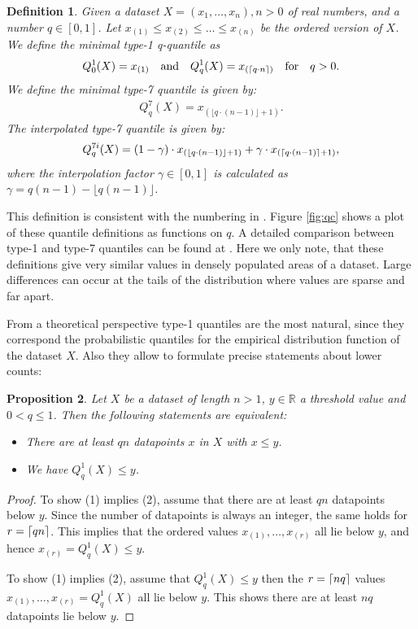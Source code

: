 \documentclass{article}
\DeclarePairedDelimiter{\ceil}{\lceil}{\rceil}
\theoremstyle{plain}
\newtheorem{definition}{Definition}[section]
\newtheorem{proposition}[definition]{Proposition}
\theoremstyle{remark}
\newcommand{\IR}{\mathbb{R}}
\newcommand{\qtext}[1]{\quad\text{#1}\quad} %
\newcommand{\floor}[1]{\lfloor#1\rfloor}
\begin{document}
\begin{definition}
  Given a dataset $X=(x_1,\dots,x_n), n>0$ of real numbers, and a number $q \in [0,1]$.
  Let $x_{(1)} \leq x_{(2)} \leq \dots \leq x_{(n)}$ be the ordered version of $X$.
  We define the minimal type-1 q-quantile as
  \begin{align*}
    Q^1_0(X) = x_{(1)} \qtext{and}  Q^1_q(X) = x_{(\ceil{q \cdot n})} \qtext{for} q > 0.
  \end{align*}
  We define the minimal type-7 quantile is given by:
  \begin{align*}
    Q^{7}_q(X) = x_{(\floor{q \cdot (n - 1)} + 1)}.
  \end{align*}
  The interpolated type-7 quantile is given by:
  \begin{align*}
    Q^{7i}_q(X) = (1 - \gamma) \cdot x_{(\floor{q \cdot (n - 1)} + 1)} + \gamma \cdot x_{(\ceil{q \cdot (n - 1)} + 1)},
  \end{align*}
  where the interpolation factor $\gamma \in [0,1]$ is calculated as $\gamma = q(n-1) - \floor{q(n-1)}$.
\end{definition}

This definition is consistent with the numbering in \cite{HF1996}.
Figure \ref{fig:qc} shows a plot of these quantile definitions as functions on $q$.
A detailed comparison between type-1 and type-7 quantiles can be found at \cite{HH19}.
Here we only note, that these definitions give very similar values in densely populated areas of a dataset.
Large differences can occur at the tails of the distribution where values are sparse and far apart.

From a theoretical perspective type-1 quantiles are the most natural, since they correspond the
probabilistic quantiles for the empirical distribution function of the dataset $X$.
Also they allow to formulate precise statements about lower counts:

\begin{proposition}
  Let $X$ be a dataset of length $n > 1$, $y \in \IR$ a threshold value and $0 < q \leq 1$.
  Then the following statements are equivalent:
  \begin{itemize}
  \item[(1)] There are at least $q n$ datapoints $x$ in $X$ with $x \leq y$.
  \item[(2)] We have $Q^1_q(X) \leq y$.
  \end{itemize}
\end{proposition}

\begin{proof}
  To show (1) implies (2), assume that there are at least $q n$ datapoints below $y$.
  Since the number of datapoints is always an integer, the same holds for $r = \ceil{q n}$.
  This implies that the ordered values $x_{(1)}, \dots, x_{(r)}$ all lie below $y$,
  and hence $x_{(r)} = Q^1_q(X) \leq y$.

  To show (1) implies (2), assume that $Q^1_q(X) \leq y$ then the $r = \ceil{n q}$ values $x_{(1)},
  \dots, x_{(r)} = Q^1_q(X)$ all lie below $y$. This shows there are at least $n q$
  datapoints lie below $y$.
\end{proof}
\end{document}
